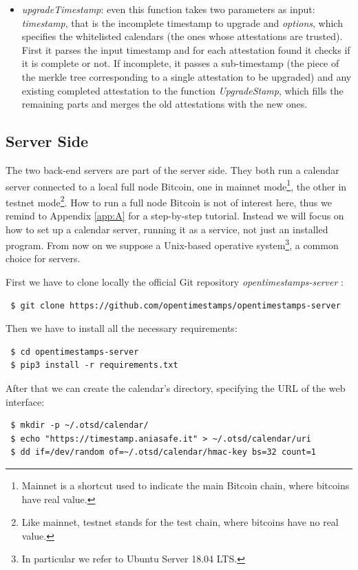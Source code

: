 \begin{itemize}
    \item \textit{upgradeTimestamp}: even this function takes two parameters as input: \textit{timestamp}, that is the incomplete timestamp to upgrade and \textit{options}, which specifies the whitelisted calendars (the ones whose attestations are trusted). First it parses the input timestamp and for each attestation found it checks if it is complete or not. If incomplete, it passes a sub-timestamp (the piece of the merkle tree corresponding to a single attestation to be upgraded) and any existing completed attestation to the function \textit{UpgradeStamp}, which fills the remaining parts and merges the old attestations with the new ones.
\end{itemize}

\bigskip
\subsection{Server Side}
\label{sec:server-side}
The two back-end servers are part of the server side. They both run a calendar server connected to a local full node Bitcoin, one in mainnet mode\footnote{Mainnet is a shortcut used to indicate the main Bitcoin chain, where bitcoins have real value.}, the other in testnet mode\footnote{Like mainnet, testnet stands for the test chain, where bitcoins have no real value.}. How to run a full node Bitcoin is not of interest here, thus we remind to Appendix \ref{app:A} for a step-by-step tutorial. Instead we will focus on how to set up a calendar server, running it as a service, not just an installed program. From now on we suppose a Unix-based operative system\footnote{In particular we refer to Ubuntu Server 18.04 LTS.}, a common choice for servers.

\bigskip
\noindent
First we have to clone locally the official Git repository \textit{opentimestamps-server} \cite{OpenTimestampsGithub}:
\begin{lstlisting}
 $ git clone https://github.com/opentimestamps/opentimestamps-server
\end{lstlisting}

\bigskip
\noindent
Then we have to install all the necessary requirements:
\begin{lstlisting}
 $ cd opentimestamps-server
 $ pip3 install -r requirements.txt
\end{lstlisting}

\bigskip
\noindent
After that we can create the calendar's directory, specifying the URL of the web interface:
\begin{lstlisting}
 $ mkdir -p ~/.otsd/calendar/
 $ echo "https://timestamp.aniasafe.it" > ~/.otsd/calendar/uri
 $ dd if=/dev/random of=~/.otsd/calendar/hmac-key bs=32 count=1
\end{lstlisting}

